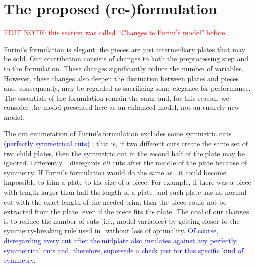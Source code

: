 \documentclass[ppgc,tese,english,formais,babel]{iiufrgs}
\newif\iffinalversion
\newcommand{\newtext}[1]{\iffinalversion%
#1%
\else%
\textcolor{blue}{#1}%
\fi%
}
\newcommand{\oldtext}[1]{\iffinalversion%
\else%
\textcolor{red}{#1}%
\fi%
}
\begin{document}

\section{The proposed (re-)formulation}
\label{sec:enhanced_model}

\oldtext{EDIT NOTE: this section was called ``Changes to Furini's model'' before.}

Furini's formulation is elegant: the pieces are just intermediary plates that may be sold.
Our contribution consists of changes to both the preprocessing step and to the formulation.
These changes significantly reduce the number of variables.
However, these changes also deepen the distinction between plates and pieces and, consequently, may be regarded as sacrificing some elegance for performance.
The essentials of the formulation remain the same and, for this reason, we consider the model presented here as an enhanced model, not an entirely new model.


The cut enumeration of Furini's formulation excludes some symmetric cuts \newtext{(perfectly symmetrical cuts)}; that is, if two different cuts create the same set of two child plates, then the symmetric cut in the second half of the plate may be ignored.
Differently,~\citet{cw:1977} disregards \emph{all} cuts after the middle of the plate because of symmetry.
If Furini's formulation would do the same as~\citet{cw:1977} it could become impossible to trim a plate to the size of a piece.
For example, if there was a piece with length larger than half the length of a plate, and such plate has no normal cut with the exact length of the needed trim, then the piece could not be extracted from the plate, even if the piece fits the plate.
The goal of our changes is to reduce the number of cuts (i.e., model variables) by getting closer to the symmetry-breaking rule used in~\citet{cw:1977} without loss of optimality.
\newtext{Of course, disregarding every cut after the midplate also insulates against any perfectly symmetrical cuts and, therefore, supersede a check just for this specific kind of symmetry.}

\end{document}
